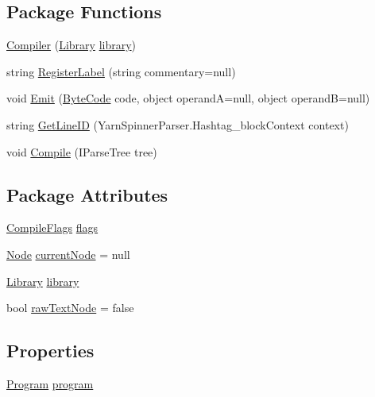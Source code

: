 \subsection*{Package Functions}
\begin{DoxyCompactItemize}
\item 
\hyperlink{a00053_a4b004fdb6aa93abee8a1a94a22ea9660}{Compiler} (\hyperlink{a00123}{Library} \hyperlink{a00053_ae211a0c080d18575bc3d299c207ef8ee}{library})
\item 
string \hyperlink{a00053_a1bae0d8b701a59708641aa36ea971fa5}{Register\-Label} (string commentary=null)
\item 
void \hyperlink{a00053_a07d6540806e6dbcbac4c1f5d5dd0cab0}{Emit} (\hyperlink{a00050_ad5dfb6ee68ca7469623ad3e459f98894}{Byte\-Code} code, object operand\-A=null, object operand\-B=null)
\item 
string \hyperlink{a00053_a88503fee196f5aa36ce01e727a34fab6}{Get\-Line\-I\-D} (Yarn\-Spinner\-Parser.\-Hashtag\-\_\-block\-Context context)
\item 
void \hyperlink{a00053_a5e3cfcde58526c1642071e51f7dac4c9}{Compile} (I\-Parse\-Tree tree)
\end{DoxyCompactItemize}
\subsection*{Package Attributes}
\begin{DoxyCompactItemize}
\item 
\hyperlink{a00053_a00350}{Compile\-Flags} \hyperlink{a00053_a541022d89bcf9bc8f794eb6d6b438d08}{flags}
\item 
\hyperlink{a00050_a00354}{Node} \hyperlink{a00053_a7384f3d524959a489d51a0a9e1f0477d}{current\-Node} = null
\item 
\hyperlink{a00123}{Library} \hyperlink{a00053_ae211a0c080d18575bc3d299c207ef8ee}{library}
\item 
bool \hyperlink{a00053_af6afc8ccb59931650919b863d62d52a4}{raw\-Text\-Node} = false
\end{DoxyCompactItemize}
\subsection*{Properties}
\begin{DoxyCompactItemize}
\item 
\hyperlink{a00140}{Program} \hyperlink{a00053_aa1737da428ec7d597009661dd8a47829}{program}
\end{DoxyCompactItemize}
